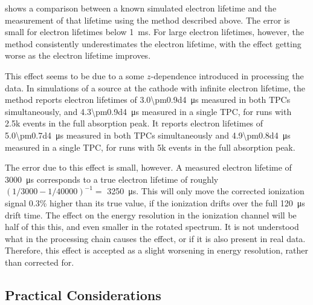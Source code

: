 \documentclass[herrin-thesis.tex]{subfiles}
\begin{document}
 shows a comparison between a known simulated electron lifetime and the measurement of that lifetime using the method described above. The error is small for electron lifetimes below \SI{1}{\ms}. For large electron lifetimes, however, the method consistently underestimates the electron lifetime, with the effect getting worse as the electron lifetime improves. 

This effect seems to be due to a some \(z\)-dependence introduced in processing the data. In simulations of a  source at the cathode with infinite electron lifetime, the method reports electron lifetimes of \SI{3.0\pm0.9d4}{\micro\second} measured in both TPCs simultaneously, and \SI{4.3\pm0.9d4}{\micro\second} measured in a single TPC, for runs with 2.5k events in the full absorption peak. It reports electron lifetimes of \SI{5.0\pm0.7d4}{\micro\second} measured in both TPCs simultaneously and \SI{4.9\pm0.8d4}{\micro\second} measured in a single TPC, for runs with 5k events in the full absorption peak.

The error due to this effect is small, however. A measured electron lifetime of \SI{3000}{\micro\second} corresponds to a true electron lifetime of roughly \((1/3000-1/40000)^{-1} =\) \SI{3250}{\micro\second}. This will only move the corrected ionization signal 0.3\% higher than its true value, if the ionization drifts over the full \SI{120}{\micro\second} drift time. The effect on the energy resolution in the ionization channel will be half of this this, and even smaller in the rotated spectrum. It is not understood what in the processing chain causes the effect, or if it is also present in real data. Therefore, this effect is accepted as a slight worsening in energy resolution, rather than corrected for.

\subsection{Practical Considerations}
\end{document}
